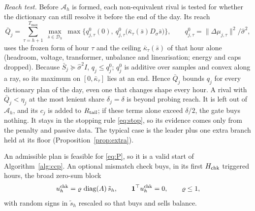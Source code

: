 \documentclass[journal,onecolumn,11pt]{IEEEtran}
\DeclareMathOperator{\diag}{diag}
\newcommand{\tp}{^{\top}}
\begin{document}
\emph{Reach test.} Before $\mathcal A_h$ is formed, each non-equivalent rival is tested for whether the dictionary can still resolve it before the end of the day. Its reach
\begin{equation}\label{eq:reach}
\bar Q_j=\sum_{\tau=h+1}^{T_{\max}}\ \max_{\bar s\in\mathcal D_h}\ \max\big\{q^0_{j,\tau}(0),\ q^0_{j,\tau}\big(\bar\kappa_\tau(\bar s)D_\sigma\bar s\big)\big\},\qquad q^0_{j,\tau}=\|\Delta\mu_{j,\tau}\|^2/\hat\sigma^2,
\end{equation}
uses the frozen form of hour $\tau$ and the ceiling $\bar\kappa_\tau(\bar s)$ of that hour alone (headroom, voltage, transformer, unbalance and linearisation; energy and caps dropped). Because $\bar S_j\succeq\hat\sigma^2I$, $q_j\le q_j^0$; $q_j^0$ is additive over samples and convex along a ray, so its maximum on $[0,\bar\kappa_\tau]$ lies at an end. Hence $\bar Q_j$ bounds $q_j$ for every dictionary plan of the day, even one that changes shape every hour. A rival with $\bar Q_j<\eta_j$ at the most lenient share $\delta_j=\delta$ is beyond probing reach. It is left out of $\mathcal A_h$, and its $c_j$ is added to $R_{\rm tail}$; if these terms alone exceed $\delta/2$, the gate buys nothing. It stays in the stopping rule \eqref{eq:stop}, so its evidence comes only from the penalty and passive data. The typical case is the leader plus one extra branch held at its floor (Proposition~\ref{prop:extra}).

An admissible plan is feasible for \eqref{eq:P}, so it is a valid start of Algorithm~\ref{alg:ccp}. An optional mismatch check buys, in its first $H_{\rm chk}$ triggered hours, the broad zero-sum block
\begin{equation}\label{eq:check}
u^{\rm chk}_h=\varrho\,\diag(A)\,\tilde s_h,\qquad \mathbf 1\tp u^{\rm chk}_h=0,\qquad \varrho\le1,
\end{equation}
with random signs in $\tilde s_h$ rescaled so that buys and sells balance.
\end{document}
